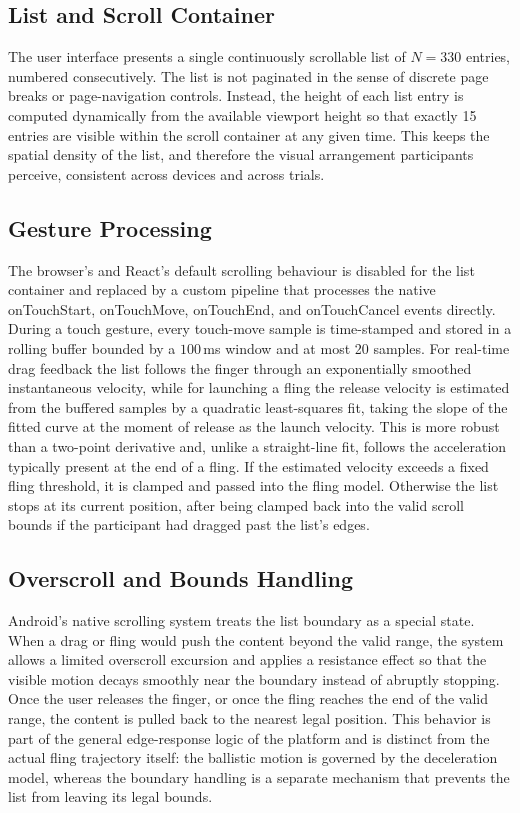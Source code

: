\documentclass[12pt,a4paper]{report}
\begin{document}
        \subsection{List and Scroll Container}

        The user interface presents a single continuously scrollable list of $N = 330$ entries, numbered consecutively. The list is not paginated in the sense of discrete page breaks or page-navigation controls. Instead, the height of each list entry is computed dynamically from the available viewport height so that exactly 15 entries are visible within the scroll container at any given time. This keeps the spatial density of the list, and therefore the visual arrangement participants perceive, consistent across devices and across trials.

        \subsection{Gesture Processing}

        The browser's and React's default scrolling behaviour is disabled for the list container and replaced by a custom pipeline that processes the native onTouchStart, onTouchMove, onTouchEnd, and onTouchCancel events directly. During a touch gesture, every touch-move sample is time-stamped and stored in a rolling buffer bounded by a $100$\,ms window and at most 20 samples. For real-time drag feedback the list follows the finger through an exponentially smoothed instantaneous velocity, while for launching a fling the release velocity is estimated from the buffered samples by a quadratic least-squares fit, taking the slope of the fitted curve at the moment of release as the launch velocity. This is more robust than a two-point derivative and, unlike a straight-line fit, follows the acceleration typically present at the end of a fling. If the estimated velocity exceeds a fixed fling threshold, it is clamped and passed into the fling model. Otherwise the list stops at its current position, after being clamped back into the valid scroll bounds if the participant had dragged past the list's edges.

        \subsection{Overscroll and Bounds Handling}

        Android's native scrolling system treats the list boundary as a special state. When a drag or fling would push the content beyond the valid range, the system allows a limited overscroll excursion and applies a resistance effect so that the visible motion decays smoothly near the boundary instead of abruptly stopping. Once the user releases the finger, or once the fling reaches the end of the valid range, the content is pulled back to the nearest legal position. This behavior is part of the general edge-response logic of the platform and is distinct from the actual fling trajectory itself: the ballistic motion is governed by the deceleration model, whereas the boundary handling is a separate mechanism that prevents the list from leaving its legal bounds.
\end{document}
